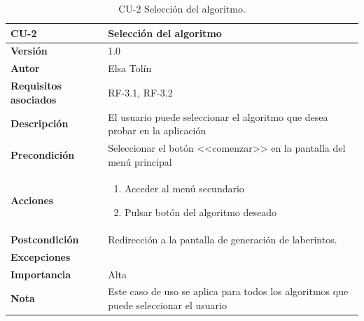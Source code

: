 \begin{table}[p]
	\centering
	\begin{tabularx}{\linewidth}{ p{} p{} }
			\toprule
			\textbf{CU-2}    & \textbf{Selección del algoritmo}\\
			\toprule
			\textbf{Versión}              & 1.0    \\
			\textbf{Autor}                & Elsa Tolín \\
			\textbf{Requisitos asociados} & RF-3.1, RF-3.2 \\
			\textbf{Descripción}          & El usuario puede seleccionar el algoritmo que desea probar en la aplicación\\
			\textbf{Precondición}         & Seleccionar el botón <<comenzar>> en la pantalla del menú principal\\
			\textbf{Acciones}             &
			\begin{enumerate}
					\def\labelenumi{\arabic{enumi}.}
					\tightlist
					\item Acceder al menú secundario
					\item Pulsar botón del algoritmo deseado
				\end{enumerate}\\
			\textbf{Postcondición}        & Redirección a la pantalla de generación de laberintos. \\
			\textbf{Excepciones}          &  \\
			\textbf{Importancia}          & Alta\\
                \textbf{Nota}          & Este caso de uso se aplica para todos los algoritmos que puede seleccionar el usuario\\
			\bottomrule
		\end{tabularx}
	\caption{CU-2 Selección del algoritmo.}
\end{table}

